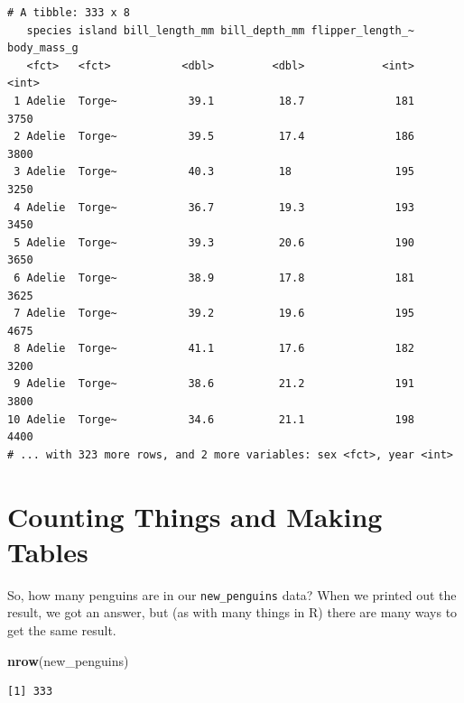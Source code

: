 \documentclass[
]{book}
\newenvironment{Shaded}{\begin{snugshade}}{\end{snugshade}}
\newcommand{\KeywordTok}[1]{\textcolor[rgb]{0.13,0.29,0.53}{\textbf{#1}}}
\newcommand{\NormalTok}[1]{#1}
\newcommand{\OperatorTok}[1]{\textcolor[rgb]{0.81,0.36,0.00}{\textbf{#1}}}
\newcommand{\StringTok}[1]{\textcolor[rgb]{0.31,0.60,0.02}{#1}}
\begin{document}
\begin{Shaded}
\end{Shaded}

\begin{verbatim}
# A tibble: 333 x 8
   species island bill_length_mm bill_depth_mm flipper_length_~ body_mass_g
   <fct>   <fct>           <dbl>         <dbl>            <int>       <int>
 1 Adelie  Torge~           39.1          18.7              181        3750
 2 Adelie  Torge~           39.5          17.4              186        3800
 3 Adelie  Torge~           40.3          18                195        3250
 4 Adelie  Torge~           36.7          19.3              193        3450
 5 Adelie  Torge~           39.3          20.6              190        3650
 6 Adelie  Torge~           38.9          17.8              181        3625
 7 Adelie  Torge~           39.2          19.6              195        4675
 8 Adelie  Torge~           41.1          17.6              182        3200
 9 Adelie  Torge~           38.6          21.2              191        3800
10 Adelie  Torge~           34.6          21.1              198        4400
# ... with 323 more rows, and 2 more variables: sex <fct>, year <int>
\end{verbatim}

\hypertarget{counting-things-and-making-tables}{%
\section{Counting Things and Making Tables}\label{counting-things-and-making-tables}}

So, how many penguins are in our \texttt{new\_penguins} data? When we printed out the result, we got an answer, but (as with many things in R) there are many ways to get the same result.

\begin{Shaded}
\begin{Highlighting}[]
\KeywordTok{nrow}\NormalTok{(new_penguins)}
\end{Highlighting}
\end{Shaded}

\begin{verbatim}
[1] 333
\end{verbatim}
\end{document}
